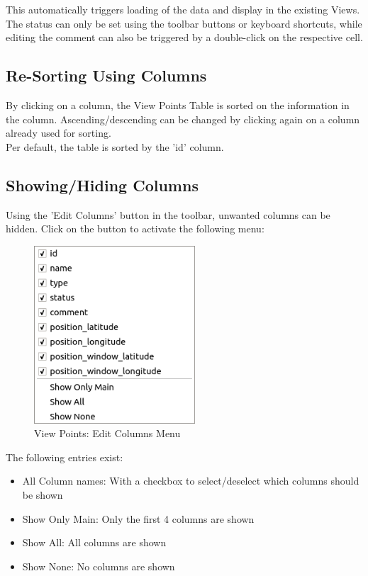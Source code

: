 This automatically triggers loading of the data and display in the existing Views. \\

The status can only be set using the toolbar buttons or keyboard shortcuts, while editing the comment can also be triggered by a double-click on the respective cell.

\subsection{Re-Sorting Using Columns}

By clicking on a column, the View Points Table is sorted on the information in the column. Ascending/descending can be changed by clicking again on a column already used for sorting. \\

Per default, the table is sorted by the 'id' column.

\subsection{Showing/Hiding Columns}

Using the 'Edit Columns' button in the toolbar, unwanted columns can be hidden. Click on the button to activate the following menu:

\begin{figure}[H]
  \centering 
    \includegraphics[width=6cm,frame]{figures/view_points_edit_columns.png}
  \caption{View Points: Edit Columns Menu}
\end{figure}

The following entries exist:

\begin{itemize}  
\item All Column names: With a checkbox to select/deselect which columns should be shown
\item Show Only Main: Only the first 4 columns are shown
\item Show All: All columns are shown
\item Show None: No columns are shown
\end{itemize}
\ \\

